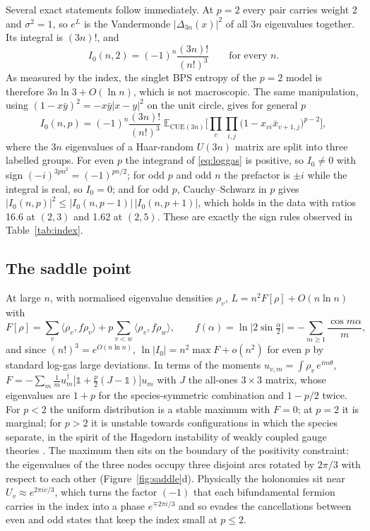 \documentclass[10pt]{article}
\begin{document}
Several exact statements follow immediately. At $p=2$ every pair carries weight 2 and $\sigma^2=1$, so $e^L$ is the
Vandermonde $|\Delta_{3n}(x)|^2$ of all $3n$ eigenvalues together. Its integral is $(3n)!$, and
\begin{equation}
I_0(n,2)=(-1)^n\frac{(3n)!}{(n!)^3}\qquad\text{for every }n .
\label{eq:p2}
\end{equation}
As measured by the index, the singlet BPS entropy of the $p=2$ model is therefore $3n\ln3+O(\ln n)$, which is not
macroscopic. The same manipulation, using $(1-x\bar y)^2=-x\bar y|x-y|^2$ on the unit circle, gives for general
$p$
\begin{equation}
I_0(n,p)=(-1)^n\frac{(3n)!}{(n!)^3}\;\mathbb E_{\mathrm{CUE}(3n)}\Big[\prod_v\prod_{i,j}\big(1-x_{vi}\bar x_{v+1,j}\big)^{p-2}\Big],
\end{equation}
where the $3n$ eigenvalues of a Haar-random $U(3n)$ matrix are split into three labelled groups. For even $p$ the
integrand of \eqref{eq:loggas} is positive, so $I_0\ne0$ with sign $(-i)^{3pn^2}=(-1)^{pn/2}$; for odd $p$ and odd $n$
the prefactor is $\pm i$ while the integral is real, so $I_0=0$; and for odd $p$, Cauchy--Schwarz in $p$ gives
$|I_0(n,p)|^2\le|I_0(n,p-1)|\,|I_0(n,p+1)|$, which holds in the data with ratios 16.6 at $(2,3)$ and 1.62 at $(2,5)$.
These are exactly the sign rules observed in Table~\ref{tab:index}.

\subsection{The saddle point}

At large $n$, with normalised eigenvalue densities $\rho_v$, $L=n^2F[\rho]+O(n\ln n)$ with
\begin{equation}
F[\rho]=\sum_v\langle\rho_v,f\rho_v\rangle+p\sum_{v<w}\langle\rho_v,f\rho_w\rangle,\qquad
f(\alpha)=\ln\big|2\sin\tfrac\alpha2\big|=-\sum_{m\ge1}\frac{\cos m\alpha}{m},
\end{equation}
and since $(n!)^3=e^{O(n\ln n)}$, $\ln|I_0|=n^2\max F+o(n^2)$ for even $p$ by standard log-gas large deviations. In
terms of the moments $u_{v,m}=\int\rho_v\,e^{im\theta}$, $F=-\sum_m\frac1m u_m^\dagger\big[\mathbb 1+\frac p2(J-\mathbb
1)\big]u_m$ with $J$ the all-ones $3\times3$ matrix, whose eigenvalues are $1+p$ for the species-symmetric
combination and $1-p/2$ twice. For $p<2$ the uniform distribution is a stable maximum with $F=0$; at $p=2$ it is
marginal; for $p>2$ it is unstable towards configurations in which the species separate, in the spirit of the
Hagedorn instability of weakly coupled gauge theories \cite{AMMPV}. The maximum then sits on the boundary of the
positivity constraint: the eigenvalues of the three nodes occupy three disjoint arcs rotated by $2\pi/3$ with
respect to each other (Figure~\ref{fig:saddle}d). Physically the holonomies sit near $U_v\approx e^{2\pi iv/3}$,
which turns the factor $(-1)$ that each bifundamental fermion carries in the index into a phase
$e^{\mp2\pi i/3}$ and so evades the cancellations between even and odd states that keep the index small at
$p\le2$.
\end{document}
